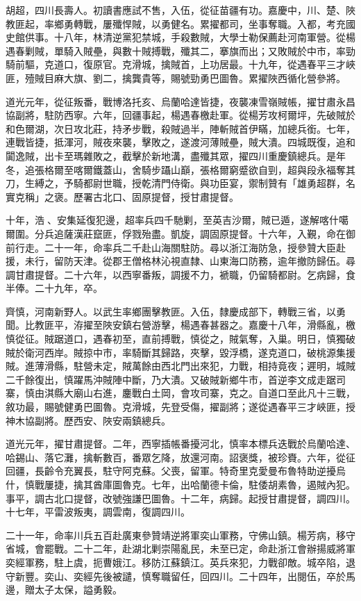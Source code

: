 \begin{pinyinscope}
胡超，四川長壽人。初讀書應試不售，入伍，從征苗疆有功。嘉慶中，川、楚、陜教匪起，率鄉勇轉戰，屢殲悍賊，以勇健名。累擢都司，坐事奪職。入都，考充國史館供事。十八年，林清逆黨犯禁城，手殺數賊，大學士勒保薦赴河南軍營。從楊遇春剿賊，單騎入賊壘，與數十賊搏戰，殲其二，搴旗而出；又敗賊於中市，率勁騎前驅，克道口，復原官。克滑城，擒賊首，上功居最。十九年，從遇春平三才峽匪，殪賊目麻大旗、劉二，擒龔貴等，賜號勁勇巴圖魯。累擢陜西循化營參將。

道光元年，從征叛番，戰博洛托亥、烏蘭哈達皆捷，夜襲凍雪嶺賊帳，擢甘肅永昌協副將，駐防西寧。六年，回疆事起，楊遇春檄赴軍。從楊芳攻柯爾坪，先破賊於和色爾湖，次日攻北莊，持矛步戰，殺賊過半，陣斬賊首伊瞞，加總兵銜。七年，連戰皆捷，抵渾河，賊夜來襲，擊敗之，遂渡河薄賊壘，賊大潰。四城既復，追和闐逸賊，出卡至瑪雜敗之，截擊於新地溝，盡殲其眾，擢四川重慶鎮總兵。是年冬，追張格爾至喀爾鐵蓋山，舍騎步躡山巔，張格爾窮蹙欲自剄，超與段永福奪其刀，生縛之，予騎都尉世職，授乾清門侍衛。與功臣宴，禦制贊有「雄勇超群，名實克稱」之褒。歷署古北口、固原提督，授甘肅提督。

十年，浩、安集延復犯邊，超率兵四千馳剿，至英吉沙爾，賊已遁，遂解喀什噶爾圍。分兵追薩漢莊竄匪，俘戮殆盡。凱旋，調固原提督。十六年，入覲，命在御前行走。二十一年，命率兵二千赴山海關駐防。尋以浙江海防急，授參贊大臣赴援，未行，留防天津。從郡王僧格林沁視直隸、山東海口防務，逾年撤防歸伍。尋調甘肅提督。二十六年，以西寧番叛，調援不力，褫職，仍留騎都尉。乞病歸，食半俸。二十九年，卒。

齊慎，河南新野人。以武生率鄉團擊教匪。入伍，隸慶成部下，轉戰三省，以勇聞。比教匪平，洊擢至陜安鎮右營游擊，楊遇春甚器之。嘉慶十八年，滑縣亂，檄慎從征。賊踞道口，遇春初至，直前搏戰，慎從之，賊氣奪，入巢。明日，慎獨破賊於衛河西岸。賊掠中市，率騎斷其歸路，夾擊，毀浮橋，遂克道口，破桃源集援賊。進薄滑縣，駐營未定，賊萬餘由西北門出來犯，力戰，相持竟夜；遲明，城賊二千餘復出，慎躍馬沖賊陣中斷，乃大潰。又破賊新鄉牛市，首逆李文成走踞司寨，慎由淇縣大廟山右進，鏖戰白土岡，會攻司寨，克之。自道口至此凡十三戰，敘功最，賜號健勇巴圖魯。克滑城，先登受傷，擢副將；遂從遇春平三才峽匪，授神木協副將。歷西安、陜安兩鎮總兵。

道光元年，擢甘肅提督。二年，西寧插帳番擾河北，慎率本標兵迭戰於烏蘭哈達、哈錫山、落它灘，擒斬數百，番眾乞降，放還河南。詔褒獎，被珍賚。六年，從征回疆，長齡令充翼長，駐守阿克蘇。父喪，留軍。特奇里克愛曼布魯特助逆擾烏什，慎戰屢捷，擒其酋庫圖魯克。七年，出哈蘭德卡倫，駐倭胡素魯，遏賊內犯。事平，調古北口提督，改號強謙巴圖魯。十二年，病歸。起授甘肅提督，調四川。十七年，平雷波叛夷，調雲南，復調四川。

二十一年，命率川兵五百赴廣東參贊靖逆將軍奕山軍務，守佛山鎮。楊芳病，移守省城，會罷戰。二十二年，赴湖北剿崇陽亂民，未至已定，命赴浙江會辦揚威將軍奕經軍務，駐上虞，扼曹娥江。移防江蘇鎮江。英兵來犯，力戰卻敵。城卒陷，退守新豐。奕山、奕經先後被譴，慎奪職留任，回四川。二十四年，出閱伍，卒於馬邊，贈太子太保，謚勇毅。


\end{pinyinscope}
